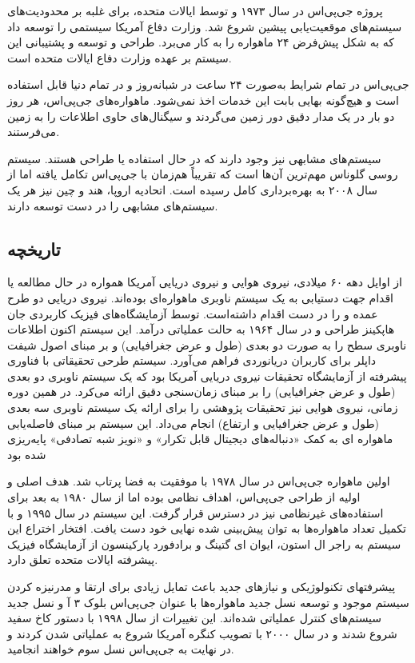 پروژه جی‌پی‌اس در سال ۱۹۷۳ و توسط ایالات متحده، برای غلبه بر محدودیت‌های سیستم‌های موقعیت‌یابی پیشین شروع شد. وزارت دفاع آمریکا سیستمی را توسعه داد که به شکل پیش‌فرض ۲۴ ماهواره را به کار می‌برد. طراحی و توسعه و پشتیبانی این سیستم بر عهده وزارت دفاع ایالات متحده است.


جی‌پی‌اس در تمام شرایط به‌صورت ۲۴ ساعت در شبانه‌روز و در تمام دنیا قابل استفاده‌ است و هیچ‌گونه بهایی بابت این خدمات اخذ نمی‌شود. ماهواره‌های جی‌پی‌اس، هر روز دو بار در یک مدار دقیق دور زمین می‌گردند و سیگنال‌های حاوی اطلاعات را به زمین می‌فرستند.


سیستم‌های مشابهی نیز وجود دارند که در حال استفاده یا طراحی هستند. سیستم روسی گلوناس مهم‌ترین آن‌ها است که تقریباً هم‌زمان با جی‌پی‌اس تکامل یافته اما از سال ۲۰۰۸ به بهره‌برداری کامل رسیده‌ است. اتحادیه اروپا، هند و چین نیز هر یک سیستم‌های مشابهی را در دست توسعه دارند.

\subsection{تاریخچه}
از اوایل دهه ۶۰ میلادی، نیروی هوایی و نیروی دریایی آمریکا همواره در حال مطالعه یا اقدام جهت دستیابی به یک سیستم ناوبری ماهواره‌ای بوده‌اند. نیروی دریایی دو طرح عمده  و  را در دست اقدام داشته‌است.  توسط آزمایشگاه‌های فیزیک کاربردی جان هاپکینز طراحی و در سال ۱۹۶۴ به حالت عملیاتی درآمد. این سیستم اکنون اطلاعات ناوبری سطح را به‌ صورت دو بعدی (طول و عرض جغرافیایی) و بر مبنای اصول شیفت داپلر برای کاربران دریانوردی فراهم می‌آورد. سیستم   طرحی تحقیقاتی با فناوری پیشرفته از آزمایشگاه تحقیقات نیروی دریایی آمریکا بود که یک سیستم ناوبری دو بعدی (طول و عرض جغرافیایی) را بر مبنای زمان‌سنجی دقیق ارائه می‌کرد. در همین دوره زمانی، نیروی هوایی نیز تحقیقات پژوهشی را برای ارائه یک سیستم ناوبری سه بعدی (طول و عرض جغرافیایی و ارتفاع) انجام می‌داد. این سیستم بر مبنای فاصله‌یابی ماهواره ای به کمک «دنباله‌های دیجیتال قابل تکرار» و «نویز شبه تصادفی» پایه‌ریزی شده بود

اولین ماهواره جی‌پی‌اس در سال ۱۹۷۸ با موفقیت به فضا پرتاب شد. هدف اصلی و اولیه از طراحی جی‌پی‌اس، اهداف نظامی بوده اما از سال ۱۹۸۰ به بعد برای استفاده‌های غیرنظامی نیز در دسترس قرار گرفت. این سیستم در سال ۱۹۹۵ و با تکمیل تعداد ماهواره‌ها به توان پیش‌بینی شده نهایی خود دست یافت. افتخار اختراع این سیستم به راجر ال استون، ایوان ای گتینگ و برادفورد پارکینسون از آزمایشگاه فیزیک پیشرفته ایالات متحده تعلق دارد.


پیشرفتهای تکنولوژیکی و نیازهای جدید باعث تمایل زیادی برای ارتقا و مدرنیزه کردن سیستم موجود و توسعه نسل جدید ماهواره‌ها با عنوان جی‌پی‌اس بلوک ۳ آ و نسل جدید سیستم‌های کنترل عملیاتی شده‌اند. این تغییرات از سال ۱۹۹۸ با دستور کاخ سفید شروع شدند و در سال ۲۰۰۰ با تصویب کنگره آمریکا شروع به عملیاتی شدن کردند و در نهایت به جی‌پی‌اس نسل سوم خواهند انجامید.

